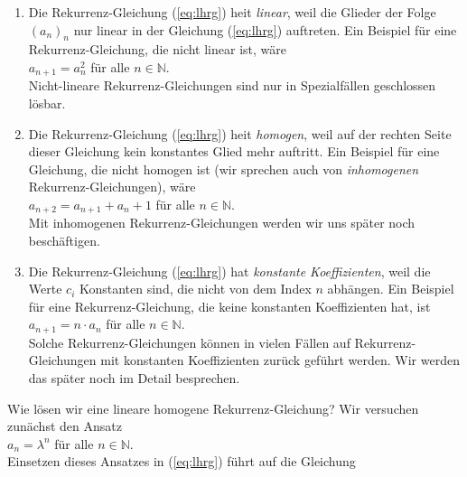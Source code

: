 \begin{enumerate}
\item Die Rekurrenz-Gleichung (\ref{eq:lhrg}) hei\3t \emph{linear}, weil die Glieder der Folge $(a_n)_n$ nur
      linear in der Gleichung (\ref{eq:lhrg}) auftreten.  Ein Beispiel f\"{u}r eine
      Rekurrenz-Gleichung, die nicht linear ist, w\"{a}re \\[0.2cm]
      \hspace*{1.3cm} $a_{n+1} = a_n^2$ \quad f\"{u}r alle $n \in \mathbb{N}$. \\[0.2cm]
      Nicht-lineare Rekurrenz-Gleichungen sind nur in Spezialf\"{a}llen geschlossen l\"{o}sbar.
\item Die Rekurrenz-Gleichung (\ref{eq:lhrg}) hei\3t \emph{homogen}, weil auf der rechten Seite
      dieser Gleichung kein konstantes Glied mehr auftritt.  Ein Beispiel f\"{u}r eine
      Gleichung, die nicht homogen ist (wir sprechen auch von \emph{inhomogenen}
      Rekurrenz-Gleichungen), w\"{a}re \\[0.2cm]
      \hspace*{1.3cm} $a_{n+2} = a_{n+1} + a_n + 1$ \quad f\"{u}r alle $n \in \mathbb{N}$. \\[0.2cm]
      Mit inhomogenen Rekurrenz-Gleichungen werden wir uns sp\"{a}ter noch besch\"{a}ftigen.
\item Die Rekurrenz-Gleichung (\ref{eq:lhrg}) hat \emph{konstante Koeffizienten}, weil die
      Werte $c_i$ Konstanten sind, die nicht von dem Index $n$ abh\"{a}ngen.  Ein Beispiel f\"{u}r
      eine Rekurrenz-Gleichung, die keine konstanten Koeffizienten hat, ist \\[0.2cm]
      \hspace*{1.3cm} $a_{n+1} = n\cdot a_n$ \quad f\"{u}r alle $n \in \mathbb{N}$. \\[0.2cm]
      Solche Rekurrenz-Gleichungen k\"{o}nnen in vielen F\"{a}llen auf Rekurrenz-Gleichungen mit
      konstanten Koeffizienten zur\"{u}ck gef\"{u}hrt werden.  Wir werden das sp\"{a}ter noch im
      Detail besprechen.
\end{enumerate}
Wie l\"{o}sen wir eine lineare homogene Rekurrenz-Gleichung?  Wir versuchen zun\"{a}chst den Ansatz\\[0.2cm]
\hspace*{1.3cm}  $a_n = \lambda^n$ \quad f\"{u}r alle $n \in \mathbb{N}$. \\[0.2cm]
Einsetzen dieses Ansatzes in (\ref{eq:lhrg}) f\"{u}hrt auf die Gleichung \\[0.2cm]
\hspace*{1.3cm}
